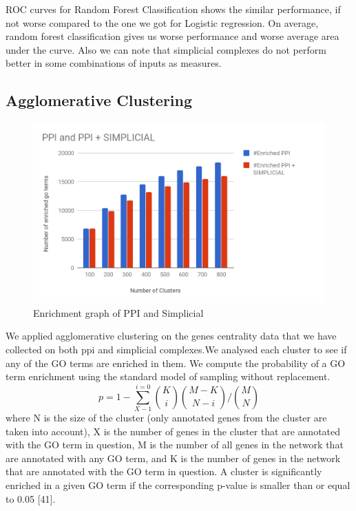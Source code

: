 \documentclass[9pt]{article}
\begin{document}
ROC curves for Random Forest Classification shows the similar performance, if not worse compared to the one we got for Logistic regression. On average, random forest classification gives us worse performance and worse average area under the curve. Also we can note that simplicial complexes do not perform better in some combinations of inputs as measures.

\subsection{Agglomerative Clustering}
\begin{figure}[!htb]
  \centering
  \includegraphics[width=\linewidth]{logisticRegressionGraphs/cluster.png}
\endminipage
\caption{Enrichment graph of PPI and Simplicial}
\end{figure}
We applied agglomerative clustering on the genes centrality data that we have collected on both ppi and simplicial complexes.We analysed each cluster to see if any of the GO terms are enriched in them. We compute the probability of a GO term enrichment using the standard model of sampling without replacement. 
\begin{equation}
p = 1 - \sum_{X-1}^{i=0}\binom{K}{i}\binom{M-K}{N-i}\bigg/\binom{M}{N}
\end{equation}
where N is the size of the cluster (only annotated genes from the cluster are taken into account), X is the number of genes in the cluster that are annotated with the GO term in question, M is the number of all genes in the network that are annotated with any GO term, and K is the number of genes in the network that are annotated with the GO term in question. A cluster is significantly enriched in a given GO term if the corresponding p-value is smaller than or equal to 0.05 [41].
\end{document}
